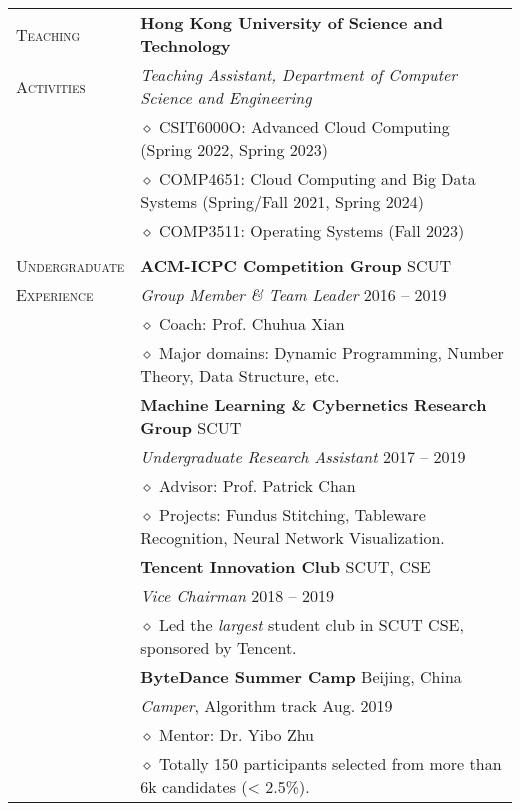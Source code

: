 \documentclass[letterpaper, 12pt]{article}
\begin{document}
\begin{longtable}{p{1.0in}p{5.8in}}
{\textsc{Teaching}}
& \textbf{Hong Kong University of Science and Technology} \\
{\textsc{Activities}}
& \textit{Teaching Assistant, Department of Computer Science and Engineering} \\
& $\diamond$ CSIT6000O: Advanced Cloud Computing (Spring 2022, Spring 2023) \\
& $\diamond$ COMP4651: Cloud Computing and Big Data Systems (Spring/Fall 2021, Spring 2024) \\
& $\diamond$ COMP3511: Operating Systems (Fall 2023) \\
& \\

{\textsc{Undergraduate}}
& \textbf{ACM-ICPC Competition Group} \hfill SCUT \\
{\textsc{Experience}}
& \textit{Group Member \& Team Leader} \hfill 2016 -- 2019 \\
& $\diamond$ Coach: Prof. Chuhua Xian \\
& $\diamond$ Major domains: Dynamic Programming, Number Theory, Data Structure, etc. \\

& \textbf{Machine Learning \& Cybernetics Research Group} \hfill SCUT \\
& \textit{Undergraduate Research Assistant} \hfill 2017 -- 2019 \\
& $\diamond$ Advisor: Prof. Patrick Chan \\
& $\diamond$ Projects: Fundus Stitching, Tableware Recognition, Neural Network Visualization. \\

& \textbf{Tencent Innovation Club} \hfill SCUT, CSE \\
& \textit{Vice Chairman} \hfill 2018 -- 2019 \\
& $\diamond$ Led the \textit{largest} student club in SCUT CSE, sponsored by Tencent. \\

& \textbf{ByteDance Summer Camp} \hfill Beijing, China \\
& \textit{Camper}, Algorithm track \hfill Aug. 2019 \\
& $\diamond$ Mentor: Dr. Yibo Zhu \\
& $\diamond$ Totally 150 participants selected from more than 6k candidates (< 2.5\%). \\


\end{longtable}
\end{document}

